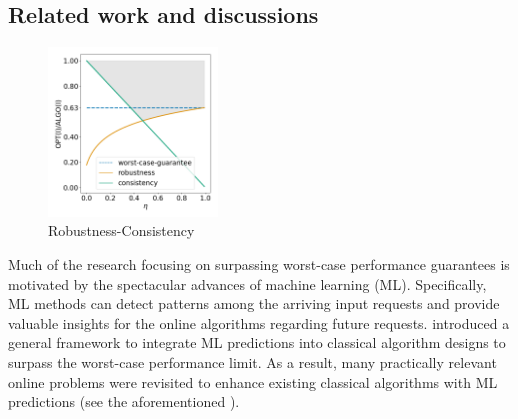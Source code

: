 \subsection{Related work and discussions}

\begin{figure}
 \vspace{-0.8cm}
  \begin{center}
    \includegraphics[width=0.4\textwidth]{../paper/Img/consistency_robustness.png}
  \end{center}
  \vspace{-1cm}
  \caption{Robustness-Consistency}
  \label{fig:robustness-consistency}
   \vspace{-0.5cm}
\end{figure}

Much of the research focusing on surpassing worst-case performance guarantees is motivated by the spectacular advances of machine learning (ML). Specifically, ML methods can detect patterns among the arriving input requests and provide valuable insights for the online algorithms regarding future requests. \cite{LykourisVassilvtiskii18:Competitive-caching} introduced a general framework to integrate ML predictions into classical algorithm designs to surpass the worst-case performance limit.
As a result, many practically relevant online problems were revisited to enhance existing classical algorithms with ML predictions (see the aforementioned \cite{LattanziLavastida20:Online-scheduling,Mitzenmacher20:Scheduling-with,LykourisVassilvtiskii18:Competitive-caching,Rohatgi20:Near-optimal-bounds,AntoniadisCoester20:Online-metric,GollapudiPanigrahi19:Online-algorithms,KumarPurohit18:Improving-online,AngelopoulosDurr20:Online-Computation,HsuIndyk19:Learning-Based-Frequency,KraskaBeutel18:The-case-for-learned,Mitzenmacher18:A-model-for-learned,AntoniosEtAll23:mixing-predictions-metric-algorithms}).

